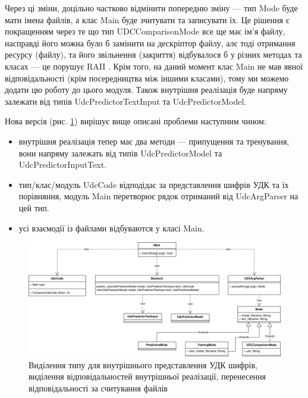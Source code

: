 \documentclass[14pt]{extarticle}
\begin{document}
  \newpage

  Через ці зміни, доцільно частково відмінити попередню зміну ---
  тип Mode буде мати імена файлів, а клас Main буде зчитувати та записувати їх.
  Це рішення є покращенням через те що тип
  UDCComparisonMode все ще має ім'я файлу,
  насправді його можна було б замінити на дескріптор файлу,
  алє тоді отримання ресурсу (файлу),
  та його звільнення (закриття) відбувалося б у різних методах та класах ---
  це порушує RAII \cite{wiki_raii}.
  Крім того, на даний момент клас Main не мав явної відповідальності
  (крім посередництва між іншими класами),
  тому ми можемо додати цю роботу до цього модуля.
  Також внутрішня реалізація буде напряму залежати
  від типів UdcPredictorTextInput та UdcPredictorModel.

  Нова версія (рис. \ref{fig:io_uml6}) вирішує вище описані проблеми
  наступним чином:
  \begin{itemize}[labelindent=\dimexpr{}\relax, leftmargin=*]
    \item внутрішня реалізація тепер має два методи ---
    припущення та тренування,
    вони напряму залежать від типів UdcPredictorModel та \\ UdcPredictorInputText.
    \item тип/клас/модуль UdcCode відподідає за представлення шифрів УДК
    та їх порівняння,
    модуль Main перетворює рядок отриманий від UdcArgParser на цей тип.
    \item усі взаємодії із файлами відбуваются у класі Main.
  \end{itemize}

  \begin{figure}
    \centering
    \includegraphics[height=0.45\textwidth]{io_uml6.drawio.png}    
    \caption{Виділення типу для внутрішнього представлення УДК шифрів,
    виділення відповідальностей внутрішньої реалізації,
    перенесення відповідальності за считування файлів}
    \label{fig:io_uml6}
  \end{figure}
\end{document}
